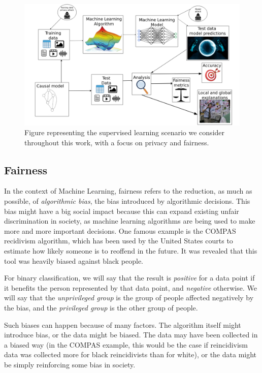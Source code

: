 \documentclass[conference]{IEEEtran}
\begin{document}
\begin{figure}[ht]
\centering
\includegraphics[width=\textwidth]{EverythingEAAO}
\caption{Figure representing the supervised learning scenario we consider throughout this work, with a focus on privacy and fairness.}\label{fig:EEAAO}
\end{figure}

\subsection{Fairness}

In the context of Machine Learning, fairness refers to the reduction, as much as possible, of \emph{algorithmic bias}, the bias introduced by algorithmic decisions. This bias might have a big social impact because this can expand existing unfair discrimination in society, as machine learning algorithms are being used to make more and more important decisions. One famous example is the COMPAS recidivism algorithm, which has been used by the United States courts to estimate how likely someone is to reoffend in the future. It was revealed \cite{Compass} that this tool was heavily biased against black people. 

For binary classification, we will say that the result is \emph{positive} for a data point if it benefits the person represented by that data point, and \emph{negative} otherwise. We will say that the \emph{unprivileged group} is the group of people affected negatively by the bias, and the \emph{privileged group} is the other group of people.

Such biases can happen because of many factors. The algorithm itself might introduce bias, or the data might be biased. The data may have been collected in a biased way (in the COMPAS example, this would be the case if reincidivism data was collected more for black reincidivists than for white), or the data might be simply reinforcing some bias in society. 
\end{document}
